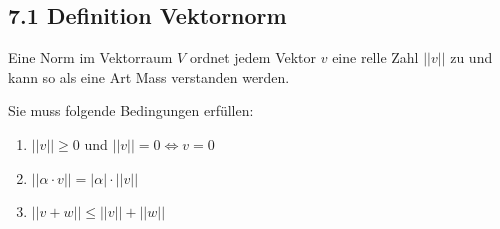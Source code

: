 \subsection{7.1 Definition Vektornorm}{
\vskip1pt
Eine Norm im Vektorraum $V$ ordnet jedem Vektor $v$ eine relle Zahl $||v||$ zu und kann so als eine Art Mass verstanden werden. \par
\vskip5pt

Sie muss folgende Bedingungen erfüllen:
\vspace{-1pt}
\begin{center}
\begin{minipage}[t]{0.7 \columnwidth}
\begin{enumerate}[label=\protect\circled{\arabic*}]
\item $||v|| \geq 0$ und $||v|| = 0 \Leftrightarrow v = 0$
\item $||\alpha \cdot v|| = |\alpha|\cdot||v||$
\item $||v + w|| \leq ||v|| + ||w||$
\end{enumerate}
\end{minipage}
\end{center}

}
\WhiteSpace
